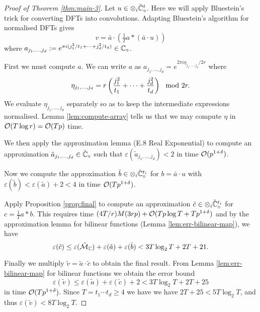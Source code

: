 \begin{proof}[Proof of Theorem \ref{thm:main-3}]
    Let $u \in \otimes_i \tilde{{\mathbb C}}_\circ^t$.
    Here we will apply Bluestein's trick for converting DFTs into convolutions. Adapting Bluestein's algorithm for normalised DFTs gives
    \[
        v = \bar{a} \cdot (\tfrac{1}{T}a \ast (\bar{a} \cdot u))
    \]
    where $a_{j_1, \ldots, j_d} := e^{\pi i (j_1^2 / t_1 + \cdots + j_d^2 / t_d)} \in {\mathbb C}_\circ$.


    First we must compute $a$. We can write $a$ as $a_{j_1, \ldots, j_d} = e^{2\pi i \eta_{j_1, \ldots, j_d}/2r}$ where
    \[
        \eta_{j_1, \ldots, j_d} = r\left(\frac{j_1^2}{t_1} + \cdots + \frac{j_d^2}{t_d}\right) \mod 2r.
    \]
    We evaluate $\eta_{j_1, \ldots, j_d}$ separately so as to keep the intermediate expressions normalised. Lemma \ref{lem:compute-array} tells us that we may compute $\eta$ in $\mathcal O(T \log r) = \mathcal O(T p)$ time. 


    We then apply the approximation lemma (E.8 Real Exponential) to compute an approximation $\tilde{a}_{j_1, \ldots, j_d} \in \tilde{{\mathbb C}}_\circ$ such that $\varepsilon(\tilde{a}_{j_1, \ldots, j_d}) < 2$ in time $\mathcal O(p^{1 + \delta})$.

    Now we compute the approximation $\tilde{b} \in \otimes_i \tilde{{\mathbb C}}^{t_i}_\circ$ for $b = \bar{a} \cdot u$ with $\varepsilon(\tilde{b}) < \varepsilon(\tilde{a}) + 2 < 4$ in time $\mathcal O(T p^{1 + \delta})$.

    Apply Proposition \ref{prop:final} to compute an approximation $\tilde{c} \in \otimes_i \tilde{{\mathbb C}}^{t_i}_\circ$ for $c = \tfrac{1}{T} a \ast b$. This requires time $(4T/r)M(3rp) + \mathcal O(Tp\log T + Tp^{1 + \delta})$ and by the approximation lemma for bilinear functions (Lemma \ref{lem:err-bilinear-map}), we have
    \[
        \varepsilon(\tilde{c}) \le \varepsilon(\tilde{\mathcal M}_{\mathbb C}) + \varepsilon(\tilde{a}) + \varepsilon(\tilde{b}) < 3T\log_2 T + 2T + 21.
    \]

    Finally we multiply $\tilde{v} = \tilde{a} \cdot \tilde{c}$ to obtain the final result. From Lemma \ref{lem:err-bilinear-map} for bilinear functions we obtain the error bound
    \[
        \varepsilon(\tilde{v}) \le \varepsilon(\tilde{a}) + \varepsilon(\tilde{c}) + 2 < 3 T \log_2 T + 2T + 25
    \]
    in time $\mathcal O(Tp^{1 + \delta})$. Since $T = t_1\cdots t_d \ge 4$ we have we have $2T + 25 < 5T \log_2 T$, and thus $\varepsilon(\tilde{v}) < 8T\log_2 T$.
\end{proof}

